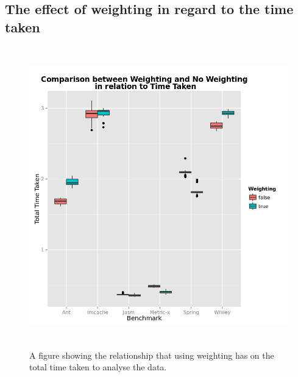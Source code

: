 \documentclass[11pt
              , a4paper
              , twoside
              , openright
              ]{report}
\begin{document}
\begin{appendices}
\chapter{The effect of weighting in regard to the time taken}
\begin{figure}[h]
\centering
\includegraphics[width=\textwidth,height=13cm]{WeightTime.png}
\caption{A figure showing the relationship that using weighting has on the total time taken to analyse the data.}
\label{fig:weighttime}
\end{figure}


\end{appendices}
\end{document}
